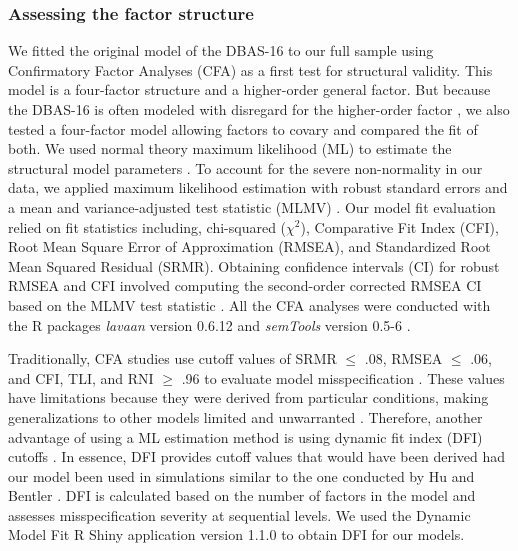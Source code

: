 \documentclass[
  12pt,
  twoside,
  openright,
  a4paper,
  chapter=TITLE,
  section=TITLE,
  brazil]{abntex2}
\begin{document}
\hypertarget{assessing-the-factor-structure}{%
\subsubsection{Assessing the factor
structure}\label{assessing-the-factor-structure}}

We fitted the original model of the DBAS-16 \autocite{morin2007a} to our
full sample using Confirmatory Factor Analyses (CFA) as a first test for
structural validity. This model is a four-factor structure and a
higher-order general factor. But because the DBAS-16 is often modeled
with disregard for the higher-order factor
\autocite{lang2017,castillo2023,boysan2010,clemente2023}, we also tested
a four-factor model allowing factors to covary and compared the fit of
both. We used normal theory maximum likelihood (ML) to estimate the
structural model parameters \autocite{rhemtulla2012}. To account for the
severe non-normality in our data, we applied maximum likelihood
estimation with robust standard errors and a mean and variance-adjusted
test statistic (MLMV) \autocite{maydeu-olivares2017}. Our model fit
evaluation relied on fit statistics including, chi-squared (\(\chi^2\)),
Comparative Fit Index (CFI), Root Mean Square Error of Approximation
(RMSEA), and Standardized Root Mean Squared Residual (SRMR). Obtaining
confidence intervals (CI) for robust RMSEA and CFI involved computing
the second-order corrected RMSEA CI based on the MLMV test statistic
\autocite{savalei2018}. All the CFA analyses were conducted with the R
packages \emph{lavaan} version 0.6.12 \autocite{R-lavaan} and
\emph{semTools} version 0.5-6 \autocite{R-semTools}.

Traditionally, CFA studies use cutoff values of SRMR \(\le\) .08, RMSEA
\(\le\) .06, and CFI, TLI, and RNI \(\ge\) .96 to evaluate model
misspecification \autocite{hu1999}. These values have limitations
because they were derived from particular conditions, making
generalizations to other models limited and unwarranted
\autocite{marsh2004}. Therefore, another advantage of using a ML
estimation method is using dynamic fit index (DFI) cutoffs
\autocite{mcneish2021}. In essence, DFI provides cutoff values that
would have been derived had our model been used in simulations similar
to the one conducted by Hu and Bentler \autocite*{hu1999}. DFI is
calculated based on the number of factors in the model and assesses
misspecification severity at sequential levels. We used the Dynamic
Model Fit R Shiny application version 1.1.0 \autocite{wolf2020} to
obtain DFI for our models.
\end{document}
